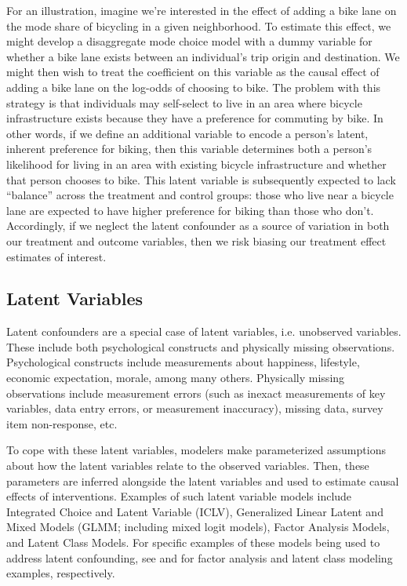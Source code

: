 For an illustration, imagine we're interested in the effect of adding a bike lane on the mode share of bicycling in a given neighborhood.
To estimate this effect, we might develop a disaggregate mode choice model with a dummy variable for whether a bike lane exists between an individual's trip origin and destination.
We might then wish to treat the coefficient on this variable as the causal effect of adding a bike lane on the log-odds of choosing to bike.
The problem with this strategy is that individuals may self-select to live in an area where bicycle infrastructure exists because they have a preference for commuting by bike.
In other words, if we define an additional variable to encode a person's latent, inherent preference for biking, then this variable determines both a person's likelihood for living in an area with existing bicycle infrastructure and whether that person chooses to bike.
This latent variable is subsequently expected to lack ``balance'' across the treatment and control groups: those who live near a bicycle lane are expected to have higher preference for biking than those who don't.
Accordingly, if we neglect the latent confounder as a source of variation in both our treatment and outcome variables,
then we risk biasing our treatment effect estimates of interest.

\subsection{Latent Variables}
\label{sec:latent-variables}
Latent confounders are a special case of latent variables, i.e. unobserved variables.
These include both psychological constructs and physically missing observations.
Psychological constructs include measurements about
happiness, lifestyle, economic expectation, morale, among many others.
Physically missing observations include measurement errors
(such as inexact measurements of key variables, data entry errors, or measurement inaccuracy),
missing data, survey item non-response, etc.

To cope with these latent variables, modelers make parameterized assumptions about how the latent variables relate to the observed variables.
Then, these parameters are inferred alongside the latent variables and used to estimate causal effects of interventions.
Examples of such latent variable models include Integrated Choice and Latent Variable (ICLV), Generalized Linear Latent and Mixed Models (GLMM; including mixed logit models), Factor Analysis Models, and Latent Class Models.
For specific examples of these models being used to address latent confounding, see \citet{louizos_2017_causal} and \citet{perrakis_2019_latent} for factor analysis and latent class modeling examples, respectively.

